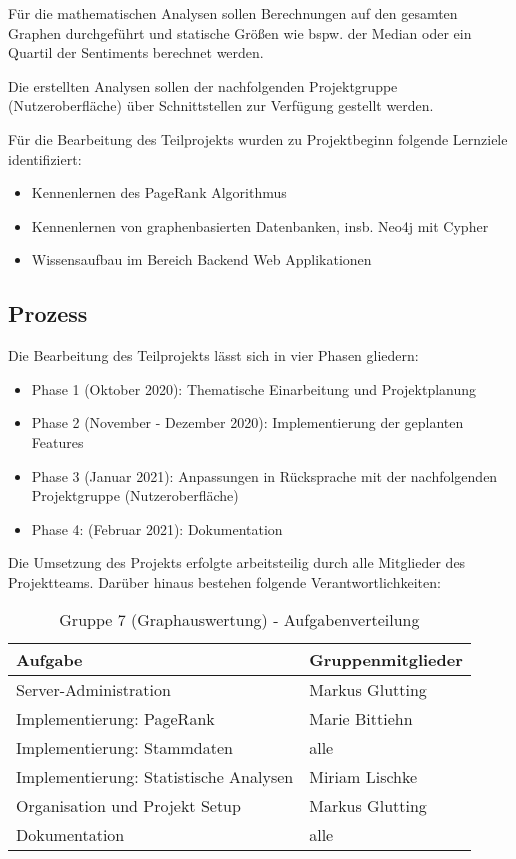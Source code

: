 Für die mathematischen Analysen sollen Berechnungen auf den gesamten Graphen durchgeführt und statische Größen wie bspw. der Median oder ein Quartil der Sentiments berechnet werden.

Die erstellten Analysen sollen der nachfolgenden Projektgruppe (Nutzeroberfläche) über Schnittstellen zur Verfügung gestellt werden.

Für die Bearbeitung des Teilprojekts wurden zu Projektbeginn folgende Lernziele identifiziert:
\begin{itemize}
  \item Kennenlernen des PageRank Algorithmus
  \item Kennenlernen von graphenbasierten Datenbanken, insb. Neo4j mit Cypher
  \item Wissensaufbau im Bereich Backend Web Applikationen
\end{itemize}

\subsection{Prozess}
Die Bearbeitung des Teilprojekts lässt sich in vier Phasen gliedern:
\begin{itemize}
  \item Phase 1 (Oktober 2020): Thematische Einarbeitung und Projektplanung
  \item Phase 2 (November - Dezember 2020): Implementierung der geplanten Features
  \item Phase 3 (Januar 2021): Anpassungen in Rücksprache mit der nachfolgenden Projektgruppe (Nutzeroberfläche)
  \item Phase 4: (Februar 2021): Dokumentation
\end{itemize}


Die Umsetzung des Projekts erfolgte arbeitsteilig durch alle Mitglieder des Projektteams.
Darüber hinaus bestehen folgende Verantwortlichkeiten:


\begin{table}[ht]
\caption{Gruppe 7 (Graphauswertung) - Aufgabenverteilung}
\label{tab:zeittafelEU}
\begin{tabular}{|p{9cm}|p{5cm}|}
\hline
\rowcolor{Gray}
Aufgabe & Gruppenmitglieder \\
\hline
Server-Administration & Markus Glutting \\
Implementierung: PageRank & Marie Bittiehn \\
Implementierung: Stammdaten & alle \\
Implementierung: Statistische Analysen & Miriam Lischke \\
Organisation und Projekt Setup & Markus Glutting \\
Dokumentation & alle \\
\hline
\end{tabular}
\end{table}


